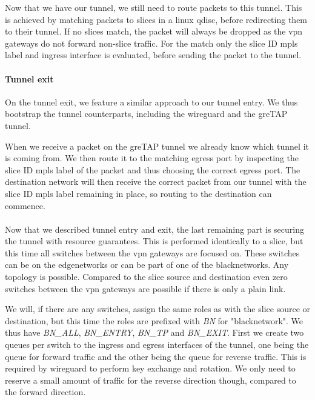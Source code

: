 Now that we have our tunnel, we still need to route packets to this tunnel. This is achieved by matching packets to slices in a linux qdisc, before redirecting them to their tunnel. If no slices match, the packet will always be dropped as the \acrshort{vpn} gateways do not forward non-slice traffic. For the match only the slice ID \acrshort{mpls} label and ingress interface is evaluated, before sending the packet to the tunnel.

\paragraph{Tunnel exit} On the tunnel exit, we feature a similar approach to our tunnel entry. We thus bootstrap the tunnel counterparts, including the \gls{wireguard} and the \acrshort{gre}TAP tunnel.

When we receive a packet on the \acrshort{gre}TAP tunnel we already know which tunnel it is coming from. We then route it to the matching egress port by inspecting the slice ID \acrshort{mpls} label of the packet and thus choosing the correct egress port. The destination network will then receive the correct packet from our tunnel with the slice ID \acrshort{mpls} label remaining in place, so routing to the destination can commence.

\paragraph{} Now that we described tunnel entry and exit, the last remaining part is securing the tunnel with resource guarantees. This is performed identically to a slice, but this time all switches between the \acrshort{vpn} gateways are focused on. These switches can be on the \gls{edgenetwork}s or can be part of one of the \gls{blacknetwork}s. Any topology is possible. Compared to the slice source and destination even zero switches between the \acrshort{vpn} gateways are possible if there is only a plain link.

We will, if there are any switches, assign the same roles as with the slice source or destination, but this time the roles are prefixed with \textit{BN} for "\gls{blacknetwork}". We thus have \textit{BN\_ALL}, \textit{BN\_ENTRY}, \textit{BN\_TP} and \textit{BN\_EXIT}. First we create two queues per switch to the ingress and egress interfaces of the tunnel, one being the queue for forward traffic and the other being the queue for reverse traffic. This is required by \gls{wireguard} to perform key exchange and rotation. We only need to reserve a small amount of traffic for the reverse direction though, compared to the forward direction.

